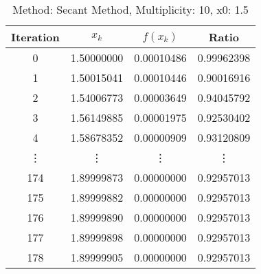 \begin{table}
\centering
\caption{Method: Secant Method, Multiplicity: 10, x0: 1.5}
\label{tab:table_Secant_Method_10_1_5}
\begin{tabular}{c c c c}
\toprule
Iteration &      $x_k$ &   $f(x_k)$ &      Ratio \\
\midrule
        0 & 1.50000000 & 0.00010486 & 0.99962398 \\
        1 & 1.50015041 & 0.00010446 & 0.90016916 \\
        2 & 1.54006773 & 0.00003649 & 0.94045792 \\
        3 & 1.56149885 & 0.00001975 & 0.92530402 \\
        4 & 1.58678352 & 0.00000909 & 0.93120809 \\
   \vdots &     \vdots &     \vdots &     \vdots \\
      174 & 1.89999873 & 0.00000000 & 0.92957013 \\
      175 & 1.89999882 & 0.00000000 & 0.92957013 \\
      176 & 1.89999890 & 0.00000000 & 0.92957013 \\
      177 & 1.89999898 & 0.00000000 & 0.92957013 \\
      178 & 1.89999905 & 0.00000000 & 0.92957013 \\
\bottomrule
\end{tabular}
\end{table}
